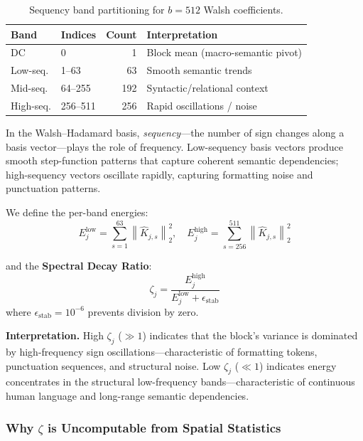 \documentclass[conference,10pt]{IEEEtran}
\newcommand{\norm}[1]{\left\|#1\right\|}
\begin{document}
\begin{table}[t]
    \centering
    \caption{Sequency band partitioning for $b = 512$ Walsh coefficients.}
    \label{tab:bands}
    \begin{tabular}{@{}llrl@{}}
        \toprule
        \textbf{Band} & \textbf{Indices} & \textbf{Count} & \textbf{Interpretation} \\
        \midrule
        DC            & 0                & 1   & Block mean (macro-semantic pivot) \\
        Low-seq.      & 1--63            & 63  & Smooth semantic trends \\
        Mid-seq.      & 64--255          & 192 & Syntactic/relational context \\
        High-seq.     & 256--511         & 256 & Rapid oscillations / noise \\
        \bottomrule
    \end{tabular}
\end{table}

In the Walsh--Hadamard basis, \emph{sequency}---the number of sign changes
along a basis vector---plays the role of frequency. Low-sequency basis vectors
produce smooth step-function patterns that capture coherent semantic
dependencies; high-sequency vectors oscillate rapidly, capturing formatting
noise and punctuation patterns.

We define the per-band energies:
\begin{equation}\label{eq:band_energy}
    E_j^{\text{low}} = \sum_{s=1}^{63} \norm{\hat{K}_{j,s}}_2^2, \quad
    E_j^{\text{high}} = \sum_{s=256}^{511} \norm{\hat{K}_{j,s}}_2^2
\end{equation}

and the \textbf{Spectral Decay Ratio}:
\begin{equation}\label{eq:zeta}
    \boxed{\zeta_j = \frac{E_j^{\text{high}}}{E_j^{\text{low}} + \epsilon_{\text{stab}}}}
\end{equation}
where $\epsilon_{\text{stab}} = 10^{-6}$ prevents division by zero.

\textbf{Interpretation.}
High $\zeta_j$ ($\gg 1$) indicates that the block's variance is dominated by
high-frequency sign oscillations---characteristic of formatting tokens,
punctuation sequences, and structural noise. Low $\zeta_j$ ($\ll 1$) indicates
energy concentrates in the structural low-frequency bands---characteristic of
continuous human language and long-range semantic dependencies.

\subsubsection{Why $\zeta$ is Uncomputable from Spatial Statistics}
\end{document}
